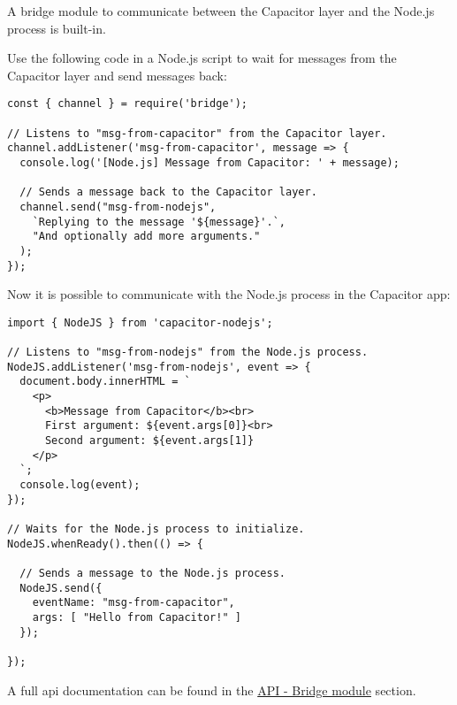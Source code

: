 A bridge module to communicate between the Capacitor layer and the Node.js process is built-in.

Use the following code in a Node.js script to wait for messages from the Capacitor layer and send messages back:

\begin{verbatim}
const { channel } = require('bridge');

// Listens to "msg-from-capacitor" from the Capacitor layer.
channel.addListener('msg-from-capacitor', message => {
  console.log('[Node.js] Message from Capacitor: ' + message);
  
  // Sends a message back to the Capacitor layer.
  channel.send("msg-from-nodejs",
    `Replying to the message '${message}'.`,
    "And optionally add more arguments."
  );
});
\end{verbatim}

\vspace{1em}

Now it is possible to communicate with the Node.js process in the Capacitor app:

\begin{verbatim}
import { NodeJS } from 'capacitor-nodejs';

// Listens to "msg-from-nodejs" from the Node.js process.
NodeJS.addListener('msg-from-nodejs', event => {
  document.body.innerHTML = `
    <p>
      <b>Message from Capacitor</b><br>
      First argument: ${event.args[0]}<br>
      Second argument: ${event.args[1]}
    </p>
  `;
  console.log(event);
});

// Waits for the Node.js process to initialize.
NodeJS.whenReady().then(() => {

  // Sends a message to the Node.js process.
  NodeJS.send({
    eventName: "msg-from-capacitor",
    args: [ "Hello from Capacitor!" ]
  });

});
\end{verbatim}

A full \ac{api} documentation can be found in the \hyperref[sec:Capacitor-NodeJS:API_BridgeModule]{API - Bridge module} section.

\printfn
